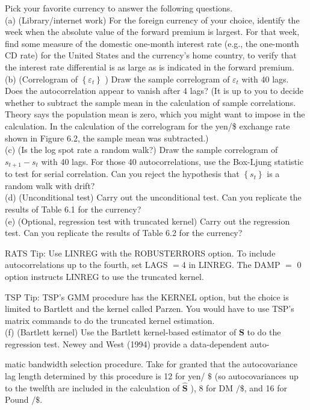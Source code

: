 \documentclass[10pt]{article}
\begin{document}
Pick your favorite currency to answer the following questions.\\
(a) (Library/internet work) For the foreign currency of your choice, identify the week when the absolute value of the forward premium is largest. For that week, find some measure of the domestic one-month interest rate (e.g., the one-month CD rate) for the United States and the currency's home country, to verify that the interest rate differential is as large as is indicated in the forward premium.\\
(b) (Correlogram of $\left\{\varepsilon_{t}\right\}$ ) Draw the sample correlogram of $\varepsilon_{t}$ with 40 lags. Does the autocorrelation appear to vanish after 4 lags? (It is up to you to decide whether to subtract the sample mean in the calculation of sample correlations. Theory says the population mean is zero, which you might want to impose in the calculation. In the calculation of the correlogram for the yen/\$ exchange rate shown in Figure 6.2, the sample mean was subtracted.)\\
(c) (Is the log spot rate a random walk?) Draw the sample correlogram of $s_{t+1}-s_{t}$ with 40 lags. For those 40 autocorrelations, use the Box-Ljung statistic to test for serial correlation. Can you reject the hypothesis that $\left\{s_{t}\right\}$ is a random walk with drift?\\
(d) (Unconditional test) Carry out the unconditional test. Can you replicate the results of Table 6.1 for the currency?\\
(e) (Optional, regression test with truncated kernel) Carry out the regression test. Can you replicate the results of Table 6.2 for the currency?

RATS Tip: Use LINREG with the ROBUSTERRORS option. To include autocorrelations up to the fourth, set LAGS $=4$ in LINREG. The DAMP $=$ 0 option instructs LINREG to use the truncated kernel.

TSP Tip: TSP's GMM procedure has the KERNEL option, but the choice is limited to Bartlett and the kernel called Parzen. You would have to use TSP's matrix commands to do the truncated kernel estimation.\\
(f) (Bartlett kernel) Use the Bartlett kernel-based estimator of $\mathbf{S}$ to do the regression test. Newey and West (1994) provide a data-dependent auto-

matic bandwidth selection procedure. Take for granted that the autocovariance lag length determined by this procedure is 12 for yen/ $\$$ (so autocovariances up to the twelfth are included in the calculation of $\widehat{\mathbf{S}}$ ), 8 for DM $/ \$$, and 16 for Pound $/ \$$.
\end{document}
